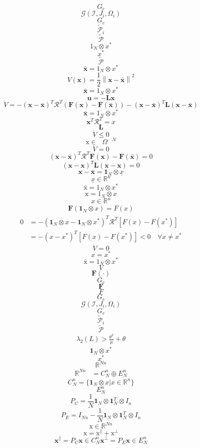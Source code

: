 \documentclass[11pt]{ctexart}
\begin{document}
$$G_{c}$$
$$\mathcal{G}(\mathcal{I},{{J}_{i}},{{\Omega }_{i}})$$
$$G_{c}$$
$${{\tilde{\mathcal{P}}}_{i}}$$
$$\tilde{\mathcal{P}}$$
$${{1}_{N}}\otimes {{x}^{*}}$$
$${{x}^{*}}$$
$$\tilde{\mathcal{P}}$$
$$\mathbf{\bar{x}}={{1}_{N}}\otimes {{x}^{*}}$$
$$V(\mathbf{x})=\frac{1}{2}{{\left\| \mathbf{x}-\mathbf{\bar{x}} \right\|}^{2}}$$
$$\mathbf{\bar{x}}={{1}_{N}}\otimes {{x}^{*}}$$
$$\mathbf{u}=-\mathbf{Lx}$$
$$\dot{V}=-{{(\mathbf{x}-\mathbf{\bar{x}})}^{T}}{{\mathcal{R}}^{T}}(\mathbf{F}(\mathbf{x})-\mathbf{F}(\mathbf{\bar{x}}))-{{(\mathbf{x}-\mathbf{\bar{x}})}^{T}}\mathbf{L}(\mathbf{x}-\mathbf{\bar{x}})$$
$$\mathbf{\bar{x}}={{1}_{N}}\otimes {{x}^{*}}$$
$${{\mathbf{x}}^{T}}{{\mathcal{R}}^{T}}=x$$
$$\mathbf{L}$$
$$\dot{V}\le 0$$
$$\text{x}\in {{\text{ }\!\!\Omega\!\!\text{ }}^{N}}$$
$$\dot{V}=0$$
$${{(\mathbf{x}-\mathbf{\bar{x}})}^{T}}{{\mathcal{R}}^{T}}\mathbf{F}(\mathbf{x})-\mathbf{F}(\mathbf{\bar{x}})=0$$
$${{(\mathbf{x}-\mathbf{x})}^{T}}\mathbf{L}(\mathbf{x}-\mathbf{x})=0$$
$$\mathbf{x}-\bar{\mathbf{x}}=\mathbf{1}_{N}\otimes\underline{x}$$
$$\underline{x}\in\mathbb{R}^{n}$$
$$\mathrm{\bar{x}=1}_{N}\otimes x^{*}$$
$$\mathrm{x}=1_{N}\otimes x$$
$$x\in\mathbb{R}^{n}$$
$$\begin{aligned}\mathbf{F}(\mathbf{1}_{N}\otimes x)=F(x)\end{aligned}$$
$$\begin{aligned}0&=-(\mathbf{1}_N\otimes x-\mathbf{1}_N\otimes x^*)^T\mathcal{R}^T[F(x)-F(x^*)]\\[1ex]&=-(x-x^*)^T[F(x)-F(x^*)]<0\quad\forall x\neq x^*\end{aligned}$$
$$\dot{V}=0$$
$$x=x^{*}$$
$$\mathrm{\bar{x}=1}_{N}\otimes x^{*}$$
$$\textit{V}$$
$$\mathbf{F}(\cdot)$$
$$G_{c}$$
$$\mathbf{F}$$
$$\textit{F}$$
$$G_{c}$$
$$\mathcal{G}(\mathcal{I},{{J}_{i}},{{\Omega }_{i}})$$
$$G_{c}$$
$${{\tilde{\mathcal{P}}}_{i}}$$
$$\tilde{\mathcal{P}}$$
$$\begin{aligned}\lambda_{2}(L)>\frac{\theta^{2}}{\mu}+\theta\end{aligned}$$
$$\mathbf{1}_{N}\otimes x^{*}$$
$$x^{*}$$
$$\mathbb{R}^{Nn}$$
$$\begin{aligned}\mathbb{R}^{Nn}&=C_N^n\oplus E_N^n\end{aligned}$$
$$C_N^n=\{\boldsymbol{1}_N\otimes x|x\in\mathbb{R}^n\}$$
$$E_{N}^n$$
$$P_C=\frac1N\mathbf{1}_N\otimes\mathbf{1}_N^T\otimes I_n$$
$$P_{E}=I_{Nn}-\frac1N\mathbf{1}_{N}\otimes\mathbf{1}_{N}^{T}\otimes I_{n}$$
$$\mathrm{x}\in\mathbb{R}^{N\textit{n}}$$
$$\mathrm{x=x^\parallel+x^\perp}$$
$$\mathbf{x}^{\parallel}=P_C\mathbf{x}\in C_N^n\mathbf{x}^{\perp}=P_E\mathbf{x}\in E_N^n$$
\end{document}
